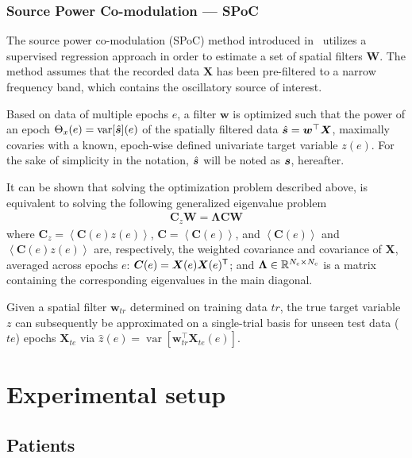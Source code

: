 \documentclass[10pt,a4paper]{article}
\providecommand{\mat}[1]{{\bm {#1}}}
\begin{document}
\subsubsection{Source Power Co-modulation --- SPoC}
\label{par:spoc}
The source power co-modulation (SPoC) method introduced in~\cite{dahne2014spoc} utilizes a supervised regression approach in order to estimate a set of spatial filters $\mat{W}$. The method assumes that the recorded data $\mat{X}$ has been pre-filtered to a narrow frequency band, which contains the oscillatory source of interest. 

Based on data of multiple epochs $e$, a filter $\mat{w}$ is optimized such that the power of an epoch $\Theta_x(e) = \operatorname{var}[\hat{{\bm {s}}}](e)$ of the spatially filtered data $\hat{\ve{s}}=\mat{w}^\top\mat{X}$, maximally covaries with a known, epoch-wise defined univariate target variable $z(e)$. For the sake of simplicity in the notation, $\hat{{\bm {s}}}$ will be noted as ${\bm {s}}$, hereafter.
 
It can be shown that solving the optimization problem described above, is equivalent to solving the following generalized eigenvalue problem
\begin{align}\label{eq:eig_spoc}
\mat{C}_z\mat{W} = \mat{\Lambda}\mat{C}\mat{W}
\end{align}
where $\mat{C}_z = \left<\mat{C}(e)z(e)\right>$, $\mat{C} = \left<\mat{C}(e)\right>$, and $\left<\mat{C}(e)\right>$ and $\left<\mat{C}(e)z(e)\right>$ are, respectively, the weighted covariance and covariance of $\mat{X}$, averaged across epochs $e$: $\mat{C}(e) = \mat{X}(e)\mat{X}(e)^\T$; and $\mat{\Lambda} \in \Real^{N_c\times N_c}$ is a matrix containing the corresponding eigenvalues in the main diagonal.

Given a spatial filter $\mat{w}_{tr}$ determined on training data $tr$, the true target variable $z$ can subsequently be approximated on a single-trial basis for unseen test data ($te$) epochs $\mat{X}_{te}$ via $\hat{z}(e) = \operatorname{var}[\mat{w}_{tr}^\top\mat{X}_{te}(e)]$. 


\section{Experimental setup}
\subsection{Patients}
\end{document}

